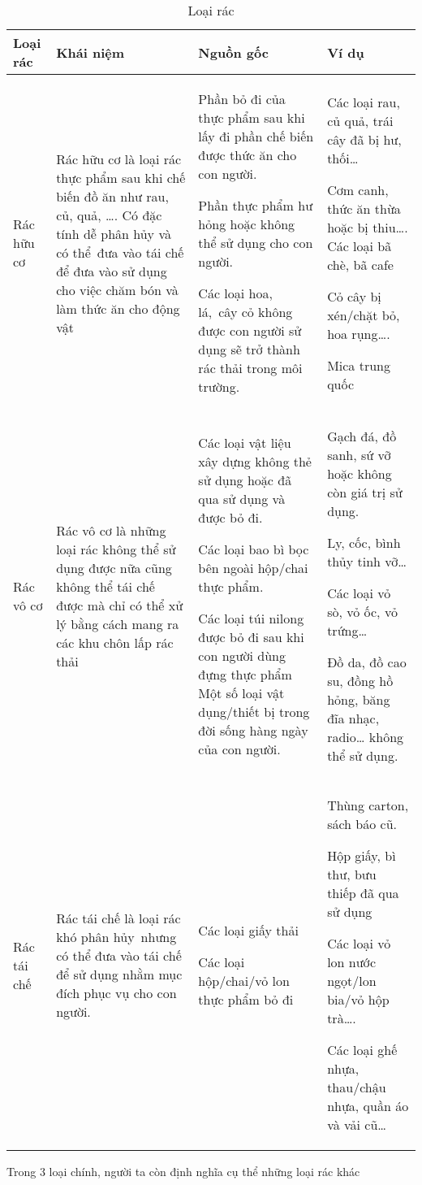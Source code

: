 \begin{table}[h]
    \caption{Loại rác} 
    \label{tab.garbage.type}
    \begin{tabular}{| m{4em} | m{4cm} | m{4cm} | m{4cm} |}
        \hline
        Loại rác & Khái niệm & Nguồn gốc & Ví dụ \\
        \hline
        Rác hữu cơ &Rác hữu cơ là loại rác thực phẩm sau khi chế biến đồ ăn như rau, củ, quả, …. Có đặc tính dễ phân hủy và có thể đưa vào tái chế để đưa vào sử dụng cho việc chăm bón và làm thức ăn cho động vật
        &
        Phần bỏ đi của thực phẩm sau khi lấy đi phần chế biến được thức ăn cho con người.
         
         
         Phần thực phẩm hư hỏng hoặc không thể sử dụng cho con người.

        Các loại hoa, lá, cây cỏ không được con người sử dụng sẽ trở thành rác thải trong môi trường.& 
         Các loại rau, củ quả, trái cây đã bị hư, thối…

        Cơm canh, thức ăn thừa hoặc bị thiu…. Các loại bã chè, bã cafe
       
         Cỏ cây bị xén/chặt bỏ, hoa rụng….
        
         Mica trung quốc\\
        
        \hline
        Rác vô cơ &
        Rác vô cơ là những loại rác không thể sử dụng được nữa cũng không thể tái chế được mà chỉ có thể xử lý bằng cách mang ra các khu chôn lấp rác thải
        &
        Các loại vật liệu xây dựng không thẻ sử dụng hoặc đã qua sử dụng và được bỏ đi.

        Các loại bao bì bọc bên ngoài hộp/chai thực phẩm.

        Các loại túi nilong được bỏ đi sau khi con người dùng đựng thực phẩm
        Một số loại vật dụng/thiết bị trong đời sống hàng ngày của con người.
        &
         Gạch đá, đồ sanh, sứ vỡ hoặc không còn giá trị sử dụng.

         Ly, cốc, bình thủy tinh vỡ…

         Các loại vỏ sò, vỏ ốc, vỏ trứng…

         Đồ da, đồ cao su, đồng hồ hỏng, băng đĩa nhạc, radio… không thể sử dụng.\\

        \hline
        Rác tái chế
        &Rác tái chế là loại rác khó phân hủy nhưng có thể đưa vào tái chế để sử dụng nhằm mục đích phục vụ cho con người.
        & Các loại giấy thải

         Các loại hộp/chai/vỏ lon thực phẩm bỏ đi
        & Thùng carton, sách báo cũ.

         Hộp giấy, bì thư, bưu thiếp đã qua sử dụng

         Các loại vỏ lon nước ngọt/lon bia/vỏ hộp trà….

         Các loại ghế nhựa, thau/chậu nhựa, quần áo và vải cũ…\\
        
        \hline
    \end{tabular}
\end{table}
Trong 3 loại chính, người ta còn định nghĩa cụ thể những loại rác khác

